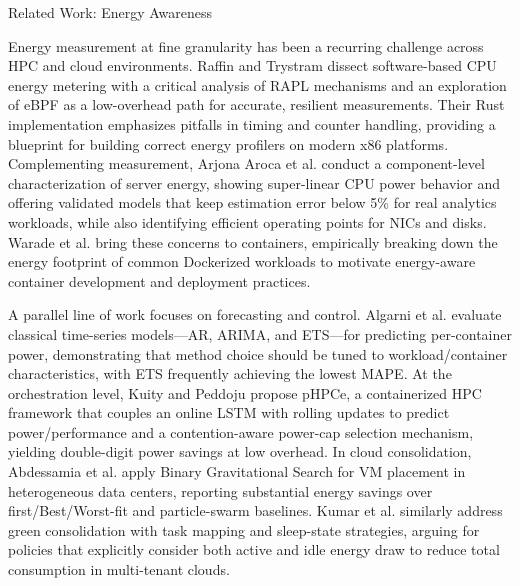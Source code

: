 Related Work: Energy Awareness

Energy measurement at fine granularity has been a recurring challenge across HPC and cloud environments. Raffin and Trystram dissect software-based CPU energy metering with a critical analysis of RAPL mechanisms and an exploration of eBPF as a low-overhead path for accurate, resilient measurements. Their Rust implementation emphasizes pitfalls in timing and counter handling, providing a blueprint for building correct energy profilers on modern x86 platforms. Complementing measurement, Arjona Aroca et al. conduct a component-level characterization of server energy, showing super-linear CPU power behavior and offering validated models that keep estimation error below 5\% for real analytics workloads, while also identifying efficient operating points for NICs and disks. Warade et al. bring these concerns to containers, empirically breaking down the energy footprint of common Dockerized workloads to motivate energy-aware container development and deployment practices.

A parallel line of work focuses on forecasting and control. Algarni et al. evaluate classical time-series models—AR, ARIMA, and ETS—for predicting per-container power, demonstrating that method choice should be tuned to workload/container characteristics, with ETS frequently achieving the lowest MAPE. At the orchestration level, Kuity and Peddoju propose pHPCe, a containerized HPC framework that couples an online LSTM with rolling updates to predict power/performance and a contention-aware power-cap selection mechanism, yielding double-digit power savings at low overhead. In cloud consolidation, Abdessamia et al. apply Binary Gravitational Search for VM placement in heterogeneous data centers, reporting substantial energy savings over first/Best/Worst-fit and particle-swarm baselines. Kumar et al. similarly address green consolidation with task mapping and sleep-state strategies, arguing for policies that explicitly consider both active and idle energy draw to reduce total consumption in multi-tenant clouds.

